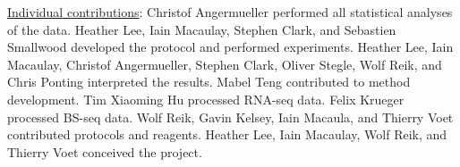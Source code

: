 \begin{center}
\begin{minipage}{.9\linewidth}
\underline{Individual contributions}: Christof Angermueller performed all statistical analyses of the data. Heather Lee, Iain Macaulay, Stephen Clark, and Sebastien Smallwood developed the protocol and performed experiments. Heather Lee, Iain Macaulay, Christof Angermueller, Stephen Clark, Oliver Stegle, Wolf Reik, and Chris Ponting interpreted the results. Mabel Teng contributed to method development. Tim Xiaoming Hu processed RNA-seq data. Felix Krueger processed BS-seq data. Wolf Reik, Gavin Kelsey, Iain Macaula, and Thierry Voet contributed protocols and reagents. Heather Lee, Iain Macaulay, Wolf Reik, and Thierry Voet conceived the project.
\end{minipage}
\end{center}
